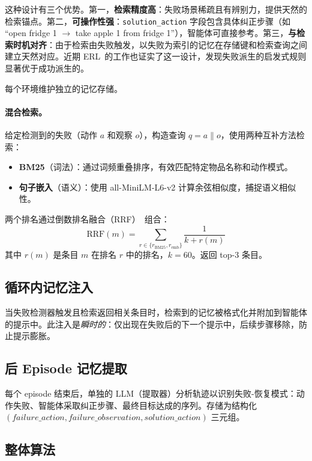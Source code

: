 \documentclass[11pt,a4paper]{article}
\begin{document}
这种设计有三个优势。第一，\textbf{检索精度高}：失败场景稀疏且有辨别力，提供天然的检索锚点。第二，\textbf{可操作性强}：\texttt{solution\_action} 字段包含具体纠正步骤（如 ``open fridge 1 $\to$ take apple 1 from fridge 1''），智能体可直接参考。第三，\textbf{与检索时机对齐}：由于检索由失败触发，以失败为索引的记忆在存储键和检索查询之间建立天然对应。近期 ERL~\cite{chen2026erl}的工作也证实了这一设计，发现失败派生的启发式规则显著优于成功派生的。

每个环境维护独立的记忆存储。

\paragraph{混合检索。} 给定检测到的失败（动作 $a$ 和观察 $o$），构造查询 $q = a \| o$，使用两种互补方法检索：
\begin{itemize}
    \item \textbf{BM25}（词法）：通过词频重叠排序，有效匹配特定物品名称和动作模式。
    \item \textbf{句子嵌入}（语义）：使用 all-MiniLM-L6-v2 计算余弦相似度，捕捉语义相似性。
\end{itemize}

两个排名通过倒数排名融合（RRF）~\cite{cormack2009reciprocal}组合：
\begin{equation}
    \text{RRF}(m) = \sum_{r \in \{r_{\text{BM25}}, r_{\text{emb}}\}} \frac{1}{k + r(m)}
\end{equation}
其中 $r(m)$ 是条目 $m$ 在排名 $r$ 中的排名，$k{=}60$。返回 top-3 条目。

\subsection{循环内记忆注入}

当失败检测器触发且检索返回相关条目时，检索到的记忆被格式化并附加到智能体的提示中。此注入是\emph{瞬时的}：仅出现在失败后的下一个提示中，后续步骤移除，防止提示膨胀。

\subsection{后 Episode 记忆提取}

每个 episode 结束后，单独的 LLM（提取器）分析轨迹以识别失败-恢复模式：动作失败、智能体采取纠正步骤、最终目标达成的序列。存储为结构化 $(failure\_action, failure\_observation, solution\_action)$ 三元组。

\subsection{整体算法}
\end{document}
